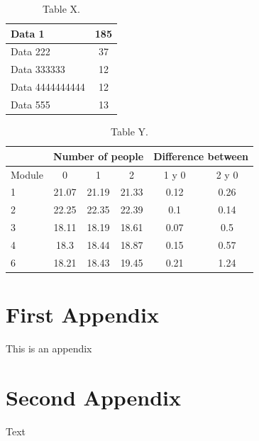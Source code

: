 \documentclass{article} %
\begin{document}
\begin{table}[H]
	\centering
		\begin{tabular}{||l | c ||}
			\hline
			\hline
			Data 1 & 185\\
			\hline
			Data 222 & 37\\
			\hline
			Data 333333 & 12\\
			\hline
			Data 4444444444 & 12\\
			\hline
			Data 555 & 13\\
			\hline
			\hline
		\end{tabular}
		\caption{Table X.}
	\label{tab:table-x}
\end{table}

\begin{table}[H]
	\centering
		\begin{tabular}{||l || c | c | c | c | c ||}
			\hline
			\hline
			& \multicolumn{3}{c|}{Number of people} & \multicolumn{2}{c||}{Difference between}\\
			\hline
			Module & 0 & 1 & 2 & 1 y 0 & 2 y 0\\
			\hline			
			\hline
			1 & 21.07 & 21.19 & 21.33 & 0.12 & 0.26\\
			\hline
			2 & 22.25 & 22.35 & 22.39 & 0.1 & 0.14\\
			\hline
			3 & 18.11 & 18.19 & 18.61 & 0.07 & 0.5\\
			\hline
			4 & 18.3 & 18.44 & 18.87 & 0.15 & 0.57\\
			\hline
			6 & 18.21 & 18.43 & 19.45 & 0.21 & 1.24\\
			\hline
			\hline
		\end{tabular}
		\caption{Table Y.}
	\label{tab:table-y}
\end{table}


\cleardoublepage

\appendix
\clearpage
\addappheadtotoc
\appendixpage

\section{First Appendix}\label{app:one}

This is an appendix

\cleardoublepage

\section{Second Appendix}\label{app:two}

Text
\end{document}
